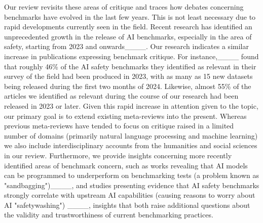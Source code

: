 Our review revisits these areas of critique and traces how debates concerning benchmarks have evolved in the last few years. This is not least necessary due to rapid developments currently seen in the field. Recent research has identified an unprecedented growth in the release of AI benchmarks, especially in the area of safety, starting from 2023 and onwards____. Our research indicates a similar increase in publications expressing benchmark critique. For instance,____ found that roughly 46\% of the AI safety benchmarks they identified as relevant in their survey of the field had been produced in 2023, with as many as 15 new datasets being released during the first two months of 2024. Likewise, almost 55\% of the articles we identified as relevant during the course of our research had been released in 2023 or later.  Given this rapid increase in attention given to the topic, our primary goal is to extend existing meta-reviews into the present. Whereas previous meta-reviews have tended to focus on critique raised in a limited number of domains (primarily natural language processing and machine learning) we also include interdisciplinary accounts from the humanities and social sciences in our review. Furthermore, we provide insights concerning more recently identified areas of benchmark concern, such as works revealing that AI models can be programmed to underperform on benchmarking tests (a problem known as "sandbagging")____, and studies presenting evidence that AI safety benchmarks strongly correlate with upstream AI capabilities (causing reasons to worry about AI "safetywashing") ____, insights that both raise additional questions about the validity and trustworthiness of current benchmarking practices. 




